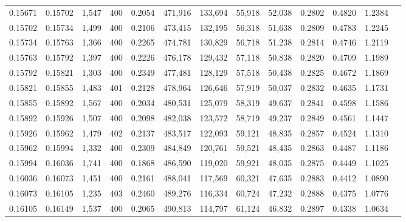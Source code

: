 \begin{tabular}{rrrrrrrrrrrrr}
0.15671 & 0.15702 &  1,547 &   400 &                                     0.2054 & 471,916 & 133,694 &  55,918 &  52,038 & 0.2802 & 0.4820 & 1.2384 \\
0.15702 & 0.15734 &  1,499 &   400 &                                     0.2106 & 473,415 & 132,195 &  56,318 &  51,638 & 0.2809 & 0.4783 & 1.2245 \\
0.15734 & 0.15763 &  1,366 &   400 &                                     0.2265 & 474,781 & 130,829 &  56,718 &  51,238 & 0.2814 & 0.4746 & 1.2119 \\
0.15763 & 0.15792 &  1,397 &   400 &                                     0.2226 & 476,178 & 129,432 &  57,118 &  50,838 & 0.2820 & 0.4709 & 1.1989 \\
0.15792 & 0.15821 &  1,303 &   400 &                                     0.2349 & 477,481 & 128,129 &  57,518 &  50,438 & 0.2825 & 0.4672 & 1.1869 \\
0.15821 & 0.15855 &  1,483 &   401 &                                     0.2128 & 478,964 & 126,646 &  57,919 &  50,037 & 0.2832 & 0.4635 & 1.1731 \\
0.15855 & 0.15892 &  1,567 &   400 &                                     0.2034 & 480,531 & 125,079 &  58,319 &  49,637 & 0.2841 & 0.4598 & 1.1586 \\
0.15892 & 0.15926 &  1,507 &   400 &                                     0.2098 & 482,038 & 123,572 &  58,719 &  49,237 & 0.2849 & 0.4561 & 1.1447 \\
0.15926 & 0.15962 &  1,479 &   402 &                                     0.2137 & 483,517 & 122,093 &  59,121 &  48,835 & 0.2857 & 0.4524 & 1.1310 \\
0.15962 & 0.15994 &  1,332 &   400 &                                     0.2309 & 484,849 & 120,761 &  59,521 &  48,435 & 0.2863 & 0.4487 & 1.1186 \\
0.15994 & 0.16036 &  1,741 &   400 &                                     0.1868 & 486,590 & 119,020 &  59,921 &  48,035 & 0.2875 & 0.4449 & 1.1025 \\
0.16036 & 0.16073 &  1,451 &   400 &                                     0.2161 & 488,041 & 117,569 &  60,321 &  47,635 & 0.2883 & 0.4412 & 1.0890 \\
0.16073 & 0.16105 &  1,235 &   403 &                                     0.2460 & 489,276 & 116,334 &  60,724 &  47,232 & 0.2888 & 0.4375 & 1.0776 \\
0.16105 & 0.16149 &  1,537 &   400 &                                     0.2065 & 490,813 & 114,797 &  61,124 &  46,832 & 0.2897 & 0.4338 & 1.0634 \\

\end{tabular}
